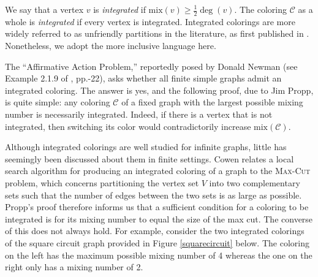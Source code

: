 \documentclass[11pt, reqno]{amsart}
\theoremstyle{definition}
\renewcommand{\geq}{\geqslant}
\begin{document}
We say that a vertex $v$ is \textit{integrated} if $\text{mix}(v) \geq \frac{1}{2}\deg(v).$ The coloring $\mathcal{C}$ as a whole is \textit{integrated} if every vertex is integrated. Integrated colorings are more widely referred to as unfriendly partitions in the literature, as first published in \cite{AMP}. Nonetheless, we adopt the more inclusive language here.

The ``Affirmative Action Problem,'' reportedly posed by Donald Newman (see Example 2.1.9 of \cite{Zeitz}, pp.-22), asks whether all finite simple graphs admit an integrated coloring. The answer is yes, and the following proof, due to Jim Propp, is quite simple: any coloring $\mathcal{C}$ of a fixed graph with the largest possible mixing number is necessarily integrated. Indeed, if there is a vertex that is not integrated, then switching its color would contradictorily increase $\text{mix}(\mathcal{C}).$

Although integrated colorings are well studied for infinite graphs, little has seemingly been discussed about them in finite settings. Cowen \cite{Cowen} relates a local search algorithm for producing an integrated coloring of a graph to the \textsc{Max-Cut} problem, which concerns partitioning the vertex set $V$ into two complementary sets such that the number of edges between the two sets is as large as possible. Propp's proof therefore informs us that a sufficient condition for a coloring to be integrated is for its mixing number to equal the size of the max cut. The converse of this does not always hold. For example, consider the two integrated colorings of the square circuit graph provided in Figure \ref{squarecircuit} below. The coloring on the left has the maximum possible mixing number of 4 whereas the one on the right only has a mixing number of 2.
\end{document}

